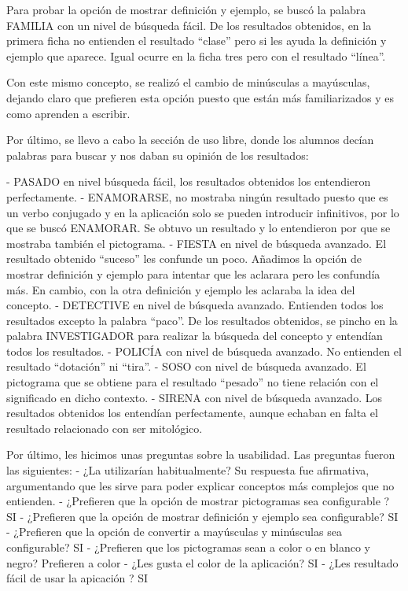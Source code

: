 Para probar la opción de mostrar definición y ejemplo, se buscó la palabra FAMILIA con un nivel de búsqueda fácil. De los resultados obtenidos, en la primera ficha no entienden el resultado ``clase'' pero si les ayuda la definición y ejemplo que aparece. Igual ocurre en la ficha tres pero con el resultado ``línea''.

Con este mismo concepto, se realizó el cambio de minúsculas a mayúsculas, dejando claro que prefieren esta opción puesto que están más familiarizados y es como aprenden a escribir.

Por último, se llevo a cabo la sección de uso libre, donde los alumnos decían palabras para buscar y nos daban su opinión de los resultados:

- PASADO en nivel búsqueda fácil, los resultados obtenidos los entendieron perfectamente.
- ENAMORARSE, no mostraba ningún resultado puesto que es un verbo conjugado y en la aplicación solo se pueden introducir infinitivos, por lo que se buscó ENAMORAR. Se obtuvo un resultado y lo entendieron por que se mostraba también el pictograma.
- FIESTA en nivel de búsqueda avanzado. El resultado obtenido ``suceso'' les confunde un poco. Añadimos la opción de mostrar definición y ejemplo para intentar que les aclarara pero les confundía más. En cambio, con la otra definición y ejemplo les aclaraba la idea del concepto.
- DETECTIVE en nivel de búsqueda avanzado. Entienden todos los resultados excepto la palabra ``paco''.
De los resultados obtenidos, se pincho en la palabra INVESTIGADOR para realizar la búsqueda del concepto y entendían todos los resultados.
- POLICÍA con nivel de búsqueda avanzado. No entienden el resultado ``dotación'' ni ``tira''.
- SOSO con nivel de búsqueda avanzado. El pictograma que se obtiene para el resultado ``pesado'' no tiene relación con el significado en dicho contexto.
- SIRENA con nivel de búsqueda avanzado. Los resultados obtenidos los entendían perfectamente, aunque echaban en falta el resultado relacionado con ser mitológico.


Por último, les hicimos unas preguntas sobre la usabilidad. Las preguntas fueron las siguientes:
- ¿La utilizarían habitualmente?
Su respuesta fue afirmativa, argumentando que les sirve para poder explicar conceptos más complejos que no entienden.
- ¿Prefieren que la opción de mostrar pictogramas sea configurable ?
SI
- ¿Prefieren que la opción de mostrar definición y ejemplo sea configurable?
SI
- ¿Prefieren que la opción de convertir a mayúsculas y minúsculas sea configurable?
SI
- ¿Prefieren que los pictogramas sean a color o en blanco y negro?
Prefieren a color
- ¿Les gusta el color de la aplicación?
SI
- ¿Les resultado fácil de usar la apicación ?
SI

